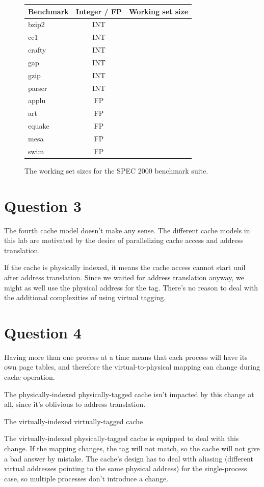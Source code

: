 \begin{figure}[htb]
\center

\begin{tabular}{lcr}
\hline
Benchmark & Integer / FP & Working set size \\
\hline
bzip2 & INT & \\
cc1 & INT & \\
crafty & INT & \\
gap & INT & \\
gzip & INT & \\
parser & INT & \\
\hline
applu & FP & \\
art & FP & \\
equake & FP & \\
mesa & FP & \\
swim & FP & \\
\hline
\end{tabular}

\caption{The working set sizes for the SPEC 2000 benchmark suite. }
\label{q2:working_set}
\end{figure}

\section{Question 3}
The fourth cache model doesn't make any sense. The different cache models in
this lab are motivated by the desire of parallelizing cache access and address
translation.

If the cache is physically indexed, it means the cache access cannot start unil
after address translation. Since we waited for address translation anyway, we
might as well use the physical address for the tag. There's no reason to deal
with the additional complexities of using virtual tagging.

\section{Question 4}
Having more than one process at a time means that each process will have its
own page tables, and therefore the virtual-to-physical mapping can change
during cache operation.

The physically-indexed physically-tagged cache isn't impacted by this change at
all, since it's oblivious to address translation.

The virtually-indexed virtually-tagged cache 

The virtually-indexed physically-tagged cache is equipped to deal with this
change. If the mapping changes, the tag will not match, so the cache will not
give a bad answer by mistake. The cache's design has to deal with aliasing
(different virtual addresses pointing to the same physical address) for the
single-process case, so multiple processes don't introduce a change.

